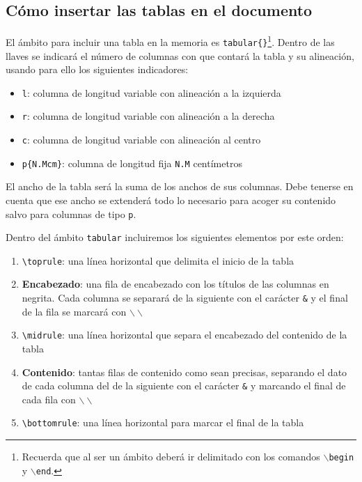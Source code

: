 \subsection{Cómo insertar las tablas en el documento}

El ámbito para incluir una tabla en la memoria es \verb|tabular{}|\footnote{Recuerda que al ser un ámbito deberá ir delimitado con los comandos \texttt{$\backslash$begin} y \texttt{$\backslash$end}.}. Dentro de las llaves se indicará el número de columnas con que contará la tabla y su alineación, usando para ello los siguientes indicadores:

\begin{itemize}
    \item \texttt{l}: columna de longitud variable con alineación a la izquierda
    \item \texttt{r}: columna de longitud variable con alineación a la derecha
    \item \texttt{c}: columna de longitud variable con alineación al centro
    \item \texttt{p\{N.Mcm\}}: columna de longitud fija \texttt{N.M} centímetros
\end{itemize}

El ancho de la tabla será la suma de los anchos de sus columnas. Debe tenerse en cuenta que ese ancho se extenderá todo lo necesario para acoger su contenido salvo para columnas de tipo \texttt{p}.

Dentro del ámbito \texttt{tabular} incluiremos los siguientes elementos por este orden:

\begin{enumerate}
    \item \verb|\toprule|: una línea horizontal que delimita el inicio de la tabla
    \item \textbf{Encabezado}: una fila de encabezado con los títulos de las columnas en negrita. Cada columna se separará de la siguiente con el carácter \texttt{\&} y el final de la fila se marcará con \texttt{$\backslash\backslash$}
    \item \verb|\midrule|: una línea horizontal que separa el encabezado del contenido de la tabla
    \item \textbf{Contenido}: tantas filas de contenido como sean precisas, separando el dato de cada columna del de la siguiente con el carácter \texttt{\&} y marcando el final de cada fila con \texttt{$\backslash\backslash$}
    \item \verb|\bottomrule|: una línea horizontal para marcar el final de la tabla
\end{enumerate}

